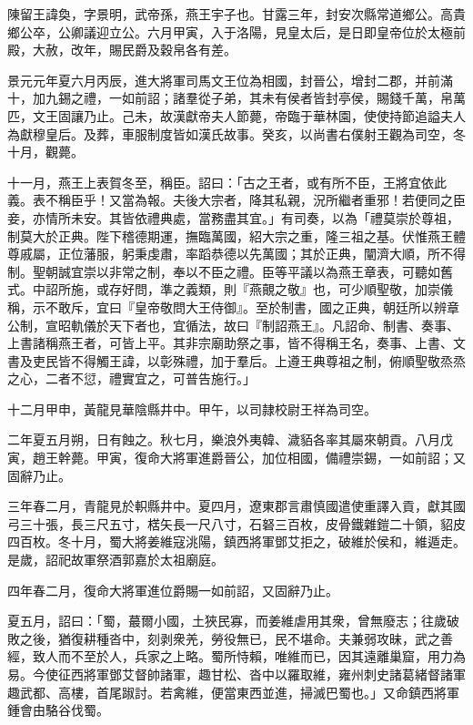 \begin{pinyinscope}
 
 
 陳留王諱奐，字景明，武帝孫，燕王宇子也。甘露三年，封安次縣常道鄉公。高貴鄉公卒，公卿議迎立公。六月甲寅，入于洛陽，見皇太后，是日即皇帝位於太極前殿，大赦，改年，賜民爵及穀帛各有差。
 
 
 
 
 景元元年夏六月丙辰，進大將軍司馬文王位為相國，封晉公，增封二郡，并前滿十，加九錫之禮，一如前詔；諸羣從子弟，其未有侯者皆封亭侯，賜錢千萬，帛萬匹，文王固讓乃止。己未，故漢獻帝夫人節薨，帝臨于華林園，使使持節追謚夫人為獻穆皇后。及葬，車服制度皆如漢氏故事。癸亥，以尚書右僕射王觀為司空，冬十月，觀薨。
 
 
 
 
 十一月，燕王上表賀冬至，稱臣。詔曰：「古之王者，或有所不臣，王將宜依此義。表不稱臣乎！又當為報。夫後大宗者，降其私親，況所繼者重邪！若便同之臣妾，亦情所未安。其皆依禮典處，當務盡其宜。」有司奏，以為「禮莫崇於尊祖，制莫大於正典。陛下稽德期運，撫臨萬國，紹大宗之重，隆三祖之基。伏惟燕王體尊戚屬，正位藩服，躬秉虔肅，率蹈恭德以先萬國；其於正典，闡濟大順，所不得制。聖朝誠宜崇以非常之制，奉以不臣之禮。臣等平議以為燕王章表，可聽如舊式。中詔所施，或存好問，準之義類，則『燕覿之敬』也，可少順聖敬，加崇儀稱，示不敢斥，宜曰『皇帝敬問大王侍御』。至於制書，國之正典，朝廷所以辨章公制，宣昭軌儀於天下者也，宜循法，故曰『制詔燕王』。凡詔命、制書、奏事、上書諸稱燕王者，可皆上平。其非宗廟助祭之事，皆不得稱王名，奏事、上書、文書及吏民皆不得觸王諱，以彰殊禮，加于羣后。上遵王典尊祖之制，俯順聖敬烝烝之心，二者不愆，禮實宜之，可普告施行。」
 
 
 
 
 十二月甲申，黃龍見華陰縣井中。甲午，以司隷校尉王祥為司空。
 
 
 
 
 二年夏五月朔，日有蝕之。秋七月，樂浪外夷韓、濊貊各率其屬來朝貢。八月戊寅，趙王幹薨。甲寅，復命大將軍進爵晉公，加位相國，備禮崇錫，一如前詔；又固辭乃止。
 
 
 
 
 三年春二月，青龍見於軹縣井中。夏四月，遼東郡言肅慎國遣使重譯入貢，獻其國弓三十張，長三尺五寸，楛矢長一尺八寸，石砮三百枚，皮骨鐵雜鎧二十領，貂皮四百枚。冬十月，蜀大將姜維寇洮陽，鎮西將軍鄧艾拒之，破維於侯和，維遁走。是歲，詔祀故軍祭酒郭嘉於太祖廟庭。
 
 
 
 
 四年春二月，復命大將軍進位爵賜一如前詔，又固辭乃止。
 
 
 
 
 夏五月，詔曰：「蜀，蕞爾小國，土狹民寡，而姜維虐用其衆，曾無廢志；往歲破敗之後，猶復耕種沓中，刻剥衆羌，勞役無已，民不堪命。夫兼弱攻昧，武之善經，致人而不至於人，兵家之上略。蜀所恃賴，唯維而已，因其遠離巢窟，用力為易。今使征西將軍鄧艾督帥諸軍，趣甘松、沓中以羅取維，雍州刺史諸葛緒督諸軍趣武都、高樓，首尾踧討。若禽維，便當東西並進，掃滅巴蜀也。」又命鎮西將軍鍾會由駱谷伐蜀。
 

\end{pinyinscope}
